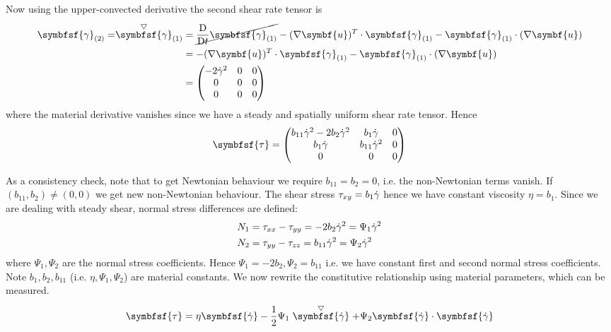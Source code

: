 \documentclass{jknotes}
\begin{document}
Now using the upper-convected derivative the second shear rate tensor is
\begin{align}
	\symbfsf{\gamma}_{(2)} =
	\stackrel{\bigtriangledown}{\symbfsf{\gamma}}_{(1)} &=
	\cancel{\frac{\diffD}{\diffD t} \symbfsf{\gamma}_{(1)}} - (\nabla \symbf{u})^T
	\cdot \symbfsf{\gamma}_{(1)} - \symbfsf{\gamma}_{(1)} \cdot (\nabla \symbf{u} )\\
	&= - (\nabla \symbf{u})^T \cdot \symbfsf{\gamma}_{(1)} -
	\symbfsf{\gamma}_{(1)}\cdot (\nabla \symbf{u}) \\
	&= \begin{pmatrix} - 2\srate^2 & 0 & 0 \\ 0 & 0 & 0 \\ 0 & 0 & 0
	\end{pmatrix}
\end{align}
where the material derivative vanishes since we have a steady and spatially
uniform shear rate tensor. Hence
\begin{equation}
	\symbfsf{\tau} = \begin{pmatrix} b_{11} \srate^2 - 2b_2 \srate^2 & b_1
		\srate & 0 \\ b_1 \srate & b_{11} \srate^2 & 0 \\ 0 & 0 & 0
	\end{pmatrix}
\end{equation}

As a consistency check, note that to get Newtonian behaviour we require
$b_{11} = b_2 = 0$, i.e. the non-Newtonian terms vanish. If $(b_{11}, b_2) \ne
(0,0)$ we get new non-Newtonian behaviour. The shear stress $\tau_{xy} = b_1
\dot{\gamma}$ hence we have constant viscosity $\eta = b_1$. Since we are dealing
with steady shear, normal stress differences are defined:
\begin{align}
	N_1 &= \tau_{xx} - \tau_{yy} = -2b_2 \dot{\gamma}^2 = \Psi_1 \dot{\gamma}^2 \\
	N_2 &= \tau_{yy} - \tau_{zz} = b_{11} \dot{\gamma}^2 = \Psi_2 \dot{\gamma}^2 \\
\end{align}
where $\Psi_1, \Psi_2$ are the normal stress coefficients. Hence $\Psi_1 =
-2b_2, \Psi_2 = b_{11}$ i.e. we have constant first and second normal stress
coefficients.  Note $b_1, b_2, b_{11}$ (i.e. $\eta, \Psi_1, \Psi_2$) are
material constants.  We now rewrite the constitutive relationship using
material parameters, which can be measured.
\begin{equation}
	\symbfsf{\tau} = \eta \symbfsf{\srate} - \frac{1}{2} \Psi_{1}
	\stackrel{\bigtriangledown}{\symbfsf{\srate}} + \Psi_2
	\symbfsf{\srate}\cdot\symbfsf{\srate}
\end{equation}
\end{document}
